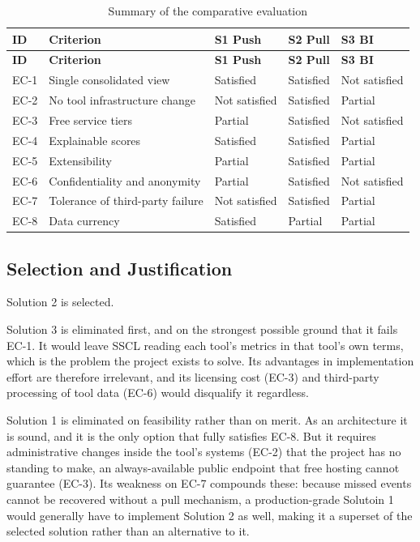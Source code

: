 \begin{longtable}{
  >{\raggedright\arraybackslash}p{}
  >{\raggedright\arraybackslash}p{}
  >{\raggedright\arraybackslash}p{}
  >{\raggedright\arraybackslash}p{}
  >{\raggedright\arraybackslash}p{}
}
\caption{Summary of the comparative evaluation}
\label{tab:primary-comparison}\\
\toprule
\textbf{ID} & \textbf{Criterion} & \textbf{S1 Push} & \textbf{S2 Pull} & \textbf{S3
BI} \\
\midrule
\endfirsthead
\toprule
\textbf{ID} & \textbf{Criterion} & \textbf{S1 Push} & \textbf{S2 Pull} & \textbf{S3
BI} \\
\midrule
\endhead
\bottomrule
\endlastfoot
EC-1 & Single consolidated view & Satisfied & Satisfied & Not satisfied \\
EC-2 & No tool infrastructure change & Not satisfied & Satisfied & Partial \\
EC-3 & Free service tiers & Partial & Satisfied & Not satisfied \\
EC-4 & Explainable scores & Satisfied & Satisfied & Partial \\
EC-5 & Extensibility & Partial & Satisfied & Partial \\
EC-6 & Confidentiality and anonymity & Partial & Satisfied & Not satisfied \\
EC-7 & Tolerance of third-party failure & Not satisfied & Satisfied & Partial \\
EC-8 & Data currency & Satisfied & Partial & Partial \\
\end{longtable}

\subsection{Selection and Justification}
\label{subsec:primary-selection}

Solution 2 is selected.

Solution 3 is eliminated first, and on the strongest possible ground that it fails EC-1. It
would leave SSCL reading each tool's metrics in that tool's own terms,
which is the problem the project exists to solve. Its advantages in
implementation effort are therefore irrelevant, and its licensing cost (EC-3)
and third-party processing of tool data (EC-6) would disqualify it regardless.

Solution 1 is eliminated on feasibility rather than on merit. As an architecture it is
sound, and it is the only option that fully satisfies EC-8. But it requires
administrative changes inside the tool's systems (EC-2) that the project has
no standing to make, an always-available public endpoint that free hosting cannot
guarantee (EC-3). Its weakness on EC-7 compounds these: because missed events
cannot be recovered without a pull mechanism, a production-grade Solutoin 1 would
generally have to implement Solution 2 as well, making it a superset of the selected
solution rather than an alternative to it.

